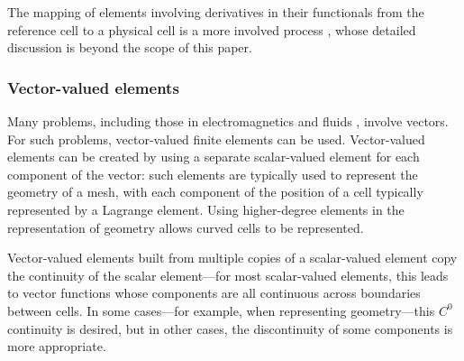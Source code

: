 \documentclass[sn-mathphys-num]{sn-jnl}%
\theoremstyle{thmstyleone}%
\theoremstyle{thmstyletwo}%
\theoremstyle{thmstylethree}%
\begin{document}
The mapping of elements involving derivatives in their functionals from the reference cell to a physical cell is a more
involved process \cite{mapping3}, whose detailed discussion is beyond the scope of this paper.

\subsubsection{Vector-valued elements}
Many problems, including those in electromagnetics \cite{monk-book} and fluids \cite{fluids-book},
involve vectors. For such problems, vector-valued finite elements can be used. Vector-valued
elements can be created by using a separate scalar-valued element for each component of the vector:
such elements are typically used to represent the geometry of a mesh, with each component of the
position of a cell typically represented by a Lagrange element. Using higher-degree elements in
the representation of geometry allows curved cells to be represented.

Vector-valued elements built from multiple copies of a scalar-valued element copy the continuity
of the scalar element---for most scalar-valued elements, this leads to vector functions whose
components are all continuous across boundaries between cells. In some cases---for example, when
representing geometry---this $C^0$ continuity is desired, but in other cases, the discontinuity of
some components is more appropriate.
\end{document}
